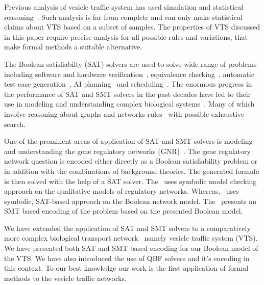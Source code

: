 Previous analysis of vesicle traffic system has used simulation and statistical reasoning~\cite{mani2016stacking}. 
%
Such analysis is far from complete and can only make statistical claims about VTS based on a subset of samples. 
%
The properties of VTS discussed in this paper require precise analysis for all possible rules and variations, that make formal methods a suitable alternative.

The Boolean satisfiabilty (SAT) solvers are used to solve wide range of problems including
%
software and hardware verification~\cite{biere1999symbolic1, biere1999symbolic2, bjesse2001finding, velev2003effective}, equivalence checking~\cite{goldberg2001using}, automatic test case generation~\cite{stephan1996combinational},
AI planning~\cite{kautz1996pushing} and scheduling~\cite{gomes1998randomization}. 
%
The enormous progress in the performance of SAT and SMT solvers
in the past decades have led to their use in modeling and understanding complex biological systems~\cite{heule2010exact,yordanov2013smt,mangla2010timing}. 
%
Many of which involve reasoning about graphs and networks rules~\cite{guerra2012reasoning,chin2008biographe} with possible exhaustive search.
%

One of the prominent areas of application of SAT and SMT solvers is modeling and understanding the gene regulatory networks (GNR)~\cite{giacobbe2015model,rosenblueth2014inference, yordanov2016method, dunn2014defining, paoletti2014analyzing, koksal2013synthesis}.
%
The gene regulatory network question is encoded either directly as a Boolean satisfiability problem or in addition with the combinations of background theories.
%
The generated formula is then solved with the help of a SAT solver. 
%
The~\cite{rosenblueth2014inference} uses symbolic model checking approach on the qualitative
models of regulatory networks.
%
Whereas,~\cite{dunn2014defining}  uses symbolic, SAT-based approach on the Boolean network model. 
%
The~\cite{giacobbe2015model, yordanov2016method} presents an SMT based encoding of the problem based on the presented Boolean model.
%

We have extended the application of SAT and SMT solvers to a comparatively more complex biological transport network~\cite{mani2016stacking} namely vesicle traffic system (VTS). 
%
We have presented both SAT and SMT based encoding for our Boolean model of the VTS.
%
We have also introduced the use of QBF solvers and it's encoding in this context.
% 
To our best knowledge our work is the first application
of formal methods to the vesicle traffic networks.

